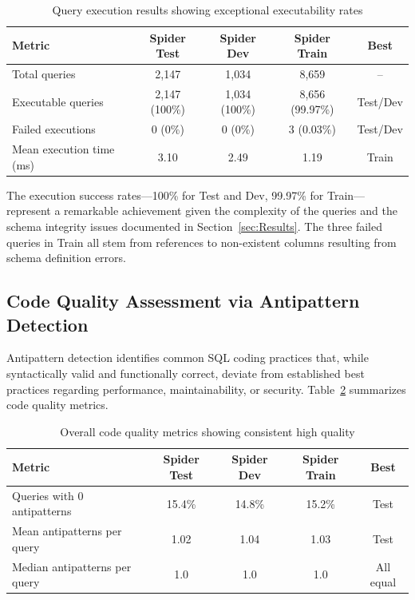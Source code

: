 \documentclass[]{einformatica}
\begin{document}
\begin{table}[ht]
    \caption{Query execution results showing exceptional executability rates}
    \label{tab:execution}
    \centering
    \footnotesize
    \begin{tabular}{lcccc}
        \toprule
        \textbf{Metric} & \textbf{Spider Test} & \textbf{Spider Dev} & \textbf{Spider Train} & \textbf{Best} \\
        \midrule
        Total queries & 2,147 & 1,034 & 8,659 & -- \\
        Executable queries & 2,147 (100\%) & 1,034 (100\%) & 8,656 (99.97\%) & Test/Dev \\
        Failed executions & 0 (0\%) & 0 (0\%) & 3 (0.03\%) & Test/Dev \\
        Mean execution time (ms) & 3.10 & 2.49 & 1.19 & Train \\
        \bottomrule
    \end{tabular}
\end{table}

The execution success rates—100\% for Test and Dev, 99.97\% for Train—represent a remarkable achievement given the complexity of the queries and the schema integrity issues documented in Section~\ref{sec:Results}. The three failed queries in Train all stem from references to non-existent columns resulting from schema definition errors.

\subsection{Code Quality Assessment via Antipattern Detection}

Antipattern detection identifies common SQL coding practices that, while syntactically valid and functionally correct, deviate from established best practices regarding performance, maintainability, or security. Table~\ref{tab:antipatterns_overall} summarizes code quality metrics.

\begin{table}[ht]
    \caption{Overall code quality metrics showing consistent high quality}
    \label{tab:antipatterns_overall}
    \centering
    \footnotesize
    \begin{tabular}{lcccc}
        \toprule
        \textbf{Metric} & \textbf{Spider Test} & \textbf{Spider Dev} & \textbf{Spider Train} & \textbf{Best} \\
        \midrule
        Queries with 0 antipatterns & 15.4\% & 14.8\% & 15.2\% & Test \\
        Mean antipatterns per query & 1.02 & 1.04 & 1.03 & Test \\
        Median antipatterns per query & 1.0 & 1.0 & 1.0 & All equal \\
        \bottomrule
    \end{tabular}
\end{table}
\end{document}
